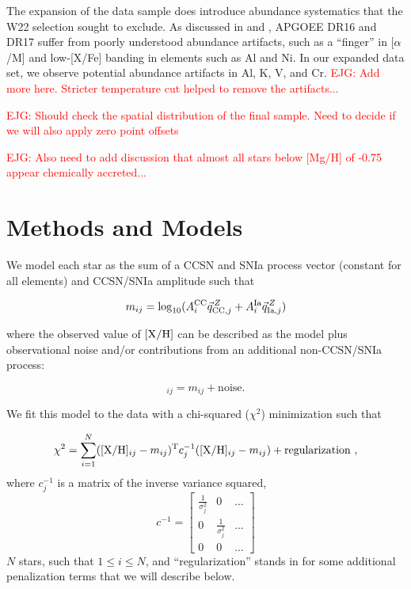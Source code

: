 \documentclass[modern]{aastex631}
\newcommand{\xh}{[{\rm X}/{\rm H}]}
\newcommand{\ejg}[1]{\textcolor{red}{EJG: #1}}
\begin{document}
The expansion of the data sample does introduce abundance systematics that the W22 selection sought to exclude. As discussed in \citet{jonsson2020} and \citet{griffith2021a}, APGOEE DR16 and DR17 suffer from poorly understood abundance artifacts, such as a ``finger'' in [$\alpha$/M] and low-[X/Fe] banding in elements such as Al and Ni. In our expanded data set, we observe potential abundance artifacts in Al, K, V, and Cr. \ejg{Add more here. Stricter temperature cut helped to remove the artifacts...}

\ejg{Should check the spatial distribution of the final sample. Need to decide if we will also apply zero point offsets}

\ejg{Also need to add discussion that almost all stars below [Mg/H] of -0.75 appear chemically accreted...}

\section{Methods and Models}\label{sec:model}

We model each star as the sum of a CCSN and SNIa process vector (constant for all elements) and CCSN/SNIa amplitude such that 

\begin{equation}
    m_{ij} = \log_{10}(A_i^{\rm CC} \vec{q}_{{\rm CC}, j}^{\,Z} + A_i^{\rm Ia} \vec{q}_{{\rm Ia}, j}^{\,Z}) 
\end{equation}

where the observed value of $\xh$ can be described as the model plus observational noise and/or contributions from an additional non-CCSN/SNIa process:

\begin{equation}
    \xh_{ij} = m_{ij} + \text{noise}.
\end{equation}

We fit this model to the data with a chi-squared ($\chi^2$) minimization such that 

\begin{equation}
    \chi^2 = \sum_{i=1}^{N} (\xh_{ij} - m_{ij})^{\rm T} c_j^{-1} (\xh_{ij} - m_{ij}) + \text{regularization}~,
\end{equation}
where $c_j^{-1}$ is a matrix of the inverse variance squared,
\begin{equation}
    c^{-1} = \begin{bmatrix}
\frac{1}{\sigma_j^2} & 0 & ...\\
0 & \frac{1}{\sigma_j^2} & ... \\
0 & 0 & ... 
\end{bmatrix}
\end{equation}
$N$ stars, such that $1 \leq i \leq N$, and ``regularization'' stands in for some additional penalization terms that we will describe below.
\end{document}
